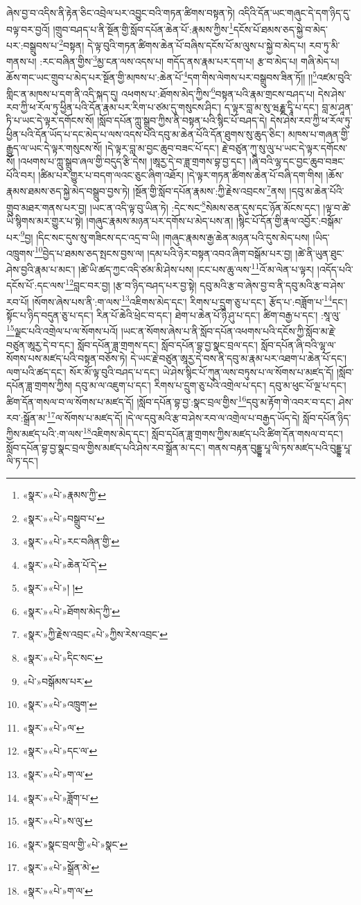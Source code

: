 ཞེས་བྱ་བ་འདིས་ནི་རྟེན་ཅིང་འབྲེལ་པར་འབྱུང་བའི་གཏན་ཚིགས་བསྟན་ཏེ། འདིའི་དོན་ཡང་གཞུང་དེ་དག་ཉིད་དུ་བལྟ་བར་བྱའོ། །གྲུབ་བཤད་པ་ནི་སྔོན་གྱི་སློབ་དཔོན་ཆེན་པོ་:རྣམས་ཀྱིས་\footnote{«སྣར་»«པེ་»རྣམས་ཀྱི་}དངོས་པོ་ཐམས་ཅད་སྐྱེ་བ་མེད་པར་:བསྒྲུབས་པ་\footnote{«སྣར་»«པེ་»བསྒྲུབ་པ་}བསྟན། དེ་ལྟ་བུའི་གཏན་ཚིགས་ཆེན་པོ་བཞིས་དངོས་པོ་མ་ལུས་པ་སྐྱེ་བ་མེད་པ། རབ་ཏུ་མི་གནས་པ། :རང་བཞིན་གྱིས་\footnote{«སྣར་»«པེ་»རང་བཞིན་གྱི་}མྱ་ངན་ལས་འདས་པ། གདོད་ནས་རྣམ་པར་དག་པ། རྩ་བ་མེད་པ། གཞི་མེད་པ། ཆོས་གང་ཡང་གྲུབ་པ་མེད་པར་སྔོན་གྱི་མཁས་པ་:ཆེན་པོ་\footnote{«སྣར་»«པེ་»ཆེན་པོ་དེ་}དག་གིས་ལེགས་པར་བསྒྲུབས་ཟིན་ཏོ།། །།\footnote{«སྣར་»«པེ་»། །}འཛམ་བུའི་གླིང་ན་མཁས་པ་དག་ནི་འདི་སྐད་དུ། འཕགས་པ་:ཐོགས་མེད་ཀྱིས་\footnote{«སྣར་»«པེ་»ཐོགས་མེད་ཀྱི་}བསྟན་པའི་རྣམ་གྲངས་བཤད་པ། དེས་ཤེས་རབ་ཀྱི་ཕ་རོལ་ཏུ་ཕྱིན་པའི་དོན་རྣམ་པར་རིག་པ་ཙམ་དུ་གསུངས་ཤིང་། ད་ལྟར་བླ་མ་སུ་ཝརྞྞ་དྭཱི་པ་དང་། བླ་མ་ཤཱན་ཏི་པ་ཡང་དེ་ལྟར་དགོངས་སོ། །སློབ་དཔོན་ཀླུ་སྒྲུབ་ཀྱིས་ནི་བསྟན་པའི་སྙིང་པོ་བཤད་དེ། དེས་ཤེས་རབ་ཀྱི་ཕ་རོལ་ཏུ་ཕྱིན་པའི་དོན་ཡོད་པ་དང་མེད་པ་ལས་འདས་པའི་དབུ་མ་ཆེན་པོའི་དོན་ཐུགས་སུ་ཆུད་ཅིང་། མཁས་པ་གཞན་གྱི་རྒྱུད་ལ་ཡང་དེ་ལྟར་གསུངས་སོ། །དེ་ལྟར་བླ་མ་བྱང་ཆུབ་བཟང་པོ་དང་། རྗེ་བཙུན་ཀུ་སུ་ལུ་པ་ཡང་དེ་ལྟར་དགོངས་སོ། །འཕགས་པ་ཀླུ་སྒྲུབ་ཞལ་གྱི་བདུད་རྩི་དེས། །ཨཱརྱ་དེ་བ་ཟླ་གྲགས་བྷ་བྱ་དང་། །ཞི་བའི་ལྷ་དང་བྱང་ཆུབ་བཟང་པོའི་བར། །ཚིམ་པར་གྱུར་པ་བདག་ལའང་ཅུང་ཞིག་འཐོར། །དེ་ལྟར་གཏན་ཚིགས་ཆེན་པོ་བཞི་དག་གིས། །ཆོས་རྣམས་ཐམས་ཅད་སྐྱེ་མེད་བསྒྲུབ་བྱས་ཏེ། །སྔོན་གྱི་སློབ་དཔོན་རྣམས་:ཀྱི་རྗེས་འབྲངས་\footnote{«སྣར་»ཀྱི་རྗེས་འབྲང་«པེ་»ཀྱིས་རེས་འབྲང་}ནས། །དབུ་མ་ཆེན་པོའི་གྲུབ་མཐར་གནས་པར་བྱ། །ཡང་ན་འདི་ལྟ་བུ་ཡིན་ཏེ། :དེང་སང་\footnote{«སྣར་»«པེ་»དིང་སང་}སེམས་ཅན་དུས་དང་ཉོན་མོངས་དང་། །ལྟ་བ་ཚེ་ཡི་སྙིགས་མར་གྱུར་པ་སྟེ། །གཞུང་རྣམས་མཉན་པར་དགོས་པ་མེད་པས་ན། །སྙིང་པོ་དོན་གྱི་རྣལ་འབྱོར་:བསྒོམ་པར་\footnote{«པེ་»བསྒོམས་པར་}བྱ། །དིང་སང་དུས་སུ་གཟིངས་དང་འདྲ་བ་ཡི། །གཞུང་རྣམས་རྒྱ་ཆེན་མཉན་པའི་དུས་མེད་པས། །ཡིད་འཁྲུགས་\footnote{«སྣར་»«པེ་»འཁྲུག་}བྱེད་པ་ཐམས་ཅད་སྤངས་བྱས་ལ། །དམ་པའི་ཉེར་བསྟན་འབའ་ཞིག་བསྒོམ་པར་བྱ། །ཚེ་ནི་ཡུན་ཐུང་ཤེས་བྱའི་རྣམ་པ་མང་། །ཚེ་ཡི་ཚད་ཀྱང་འདི་ཙམ་མི་ཤེས་པས། །ངང་པས་ཆུ་ལས་\footnote{«སྣར་»«པེ་»ལ་}འོ་མ་ལེན་པ་ལྟར། །འདོད་པའི་དངོས་པོ་:དང་ལས་\footnote{«སྣར་»«པེ་»དང་ལ་}བླང་བར་བྱ། །རྩ་བ་ཉིད་བཤད་པར་བྱ་སྟེ། དབུ་མའི་རྩ་བ་ཞེས་བྱ་བ་ནི་དབུ་མའི་རྩ་བ་ཤེས་རབ་པོ། །སོགས་ཞེས་པས་ནི་:ག་ལས་\footnote{«སྣར་»«པེ་»ག་ལ་}འཇིགས་མེད་དང་། རིགས་པ་དྲུག་ཅུ་པ་དང་། རྩོད་པ་:བཟློག་པ་\footnote{«སྣར་»«པེ་»ཟློག་པ་}དང་། སྟོང་པ་ཉིད་བདུན་ཅུ་པ་དང་། རིན་པོ་ཆེའི་ཕྲེང་བ་དང་། ཐེག་པ་ཆེན་པོ་ཉི་ཤུ་པ་དང་། ཚིག་བརྒྱ་པ་དང་། :སཱ་ལུ་\footnote{«སྣར་»«པེ་»ས་ལུ་}ལྗང་པའི་འགྲེལ་པ་ལ་སོགས་པའོ། །ཡང་ན་སོགས་ཞེས་པ་ནི་སློབ་དཔོན་འཕགས་པའི་དངོས་ཀྱི་སློབ་མ་རྗེ་བཙུན་ཨཱརྱ་དེ་བ་དང་། སློབ་དཔོན་ཟླ་གྲགས་དང་། སློབ་དཔོན་བྷ་བྱ་སྣང་བྲལ་དང་། སློབ་དཔོན་ཞི་བའི་ལྷ་ལ་སོགས་པས་མཛད་པའི་བསྟན་བཅོས་ཏེ། དེ་ཡང་རྗེ་བཙུན་ཨཱརྱ་དེ་བས་ནི་དབུ་མ་རྣམ་པར་འཐག་པ་ཆེན་པོ་དང་། ལག་པའི་ཚད་དང་། སོར་མོ་ལྟ་བུའི་བཤད་པ་དང་། ཡེ་ཤེས་སྙིང་པོ་ཀུན་ལས་བཏུས་པ་ལ་སོགས་པ་མཛད་དོ། །སློབ་དཔོན་ཟླ་གྲགས་ཀྱིས། དབུ་མ་ལ་འཇུག་པ་དང་། རིགས་པ་དྲུག་ཅུ་པའི་འགྲེལ་པ་དང་། དབུ་མ་ཕུང་པོ་ལྔ་པ་དང་། ཚིག་དོན་གསལ་བ་ལ་སོགས་པ་མཛད་དོ། །སློབ་དཔོན་བྷ་བྱ་:སྣང་བྲལ་གྱིས་\footnote{«སྣར་»སྣང་བྲལ་གྱི་«པེ་»སྣང་}དབུ་མ་རྟོག་གེ་འབར་བ་དང་། ཤེས་རབ་:སྒྲོན་མ་\footnote{«སྣར་»«པེ་»སྒྲོན་མེ་}ལ་སོགས་པ་མཛད་དོ། །དེ་ལ་དབུ་མའི་རྩ་བ་ཤེས་རབ་ལ་འགྲེལ་པ་བརྒྱད་ཡོད་དེ། སློབ་དཔོན་ཉིད་ཀྱིས་མཛད་པའི་:ག་ལས་\footnote{«སྣར་»«པེ་»ག་ལ་}འཇིགས་མེད་དང་། སློབ་དཔོན་ཟླ་གྲགས་ཀྱིས་མཛད་པའི་ཚིག་དོན་གསལ་བ་དང་། སློབ་དཔོན་བྷ་བྱ་སྣང་བྲལ་གྱིས་མཛད་པའི་ཤེས་རབ་སྒྲོན་མ་དང་། གནས་བརྟན་བུདྡྷ་པཱ་ལི་ཏས་མཛད་པའི་བུདྡྷ་པཱ་ལི་ཏ་དང་། 